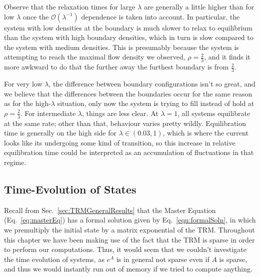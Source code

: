 Observe that the relaxation times for large $\lambda$ are generally a little higher than for low 
$\lambda$ once the $\mathcal{O}(\lambda^{-1})$ dependence is taken into account. In particular, the
system with low densities at the boundary is much slower to relax to equilibrium than the system with high boundary densities, which in turn is slow compared to the system with medium densities. This is
presumably because the system is attempting to reach the maximal flow density we observed, $\rho = \frac{2}{3}$, and it finds it more awkward to do that the further away the furthest boundary is from
$\frac{2}{3}$.

For very low $\lambda$, the difference between boundary configurations isn't so great, and we believe
that the differences between the boundaries occur for the same reason as for the high-$\lambda$
situation, only now the system is trying to fill instead of hold at $\rho=\frac{2}{3}$. For intermediate
$\lambda$, things are less clear. At $\lambda=1$, all systems equilibrate at the same rate; other than
that, behaviour varies pretty wildly. Equilibration time is generally on the high side for
$\lambda \in (0.03, 1)$, which is where the current looks like its undergoing some kind of
transition, so this increase in relative equilibration time could be interpreted as an accumulation of
fluctuations in that regime.
\subsection{Time-Evolution of States}
Recall from Sec.~\ref{sec:TRMGeneralResults} that the Master Equation (Eq.~\ref{eq:masterEq}) has
a formal solution given by Eq.~\ref{eqn:formalSoln}, in which we premultiply the initial state
by a matrix exponential of the TRM. Throughout this chapter we have been making use of the fact that
the TRM is sparse in order to perform our computations. Thus, it would seem that we couldn't
investigate the time evolution of systems, as $e^A$ is in general not sparse even if $A$ is sparse,
and thus we would instantly run out of memory if we tried to compute anything.

